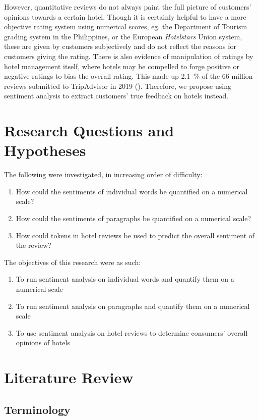 \documentclass[12pt, twoside, a4paper, draft]{pancake-article}
\begin{document}
However, quantitative reviews do not always paint the full picture of customers'
opinions towards a certain hotel. Though it is certainly helpful to have a more
objective rating system using numerical scores, eg. the Department of Tourism
grading system in the Philippines, or the European \textit{Hotelstars} Union system,
these are given by customers subjectively and do not reflect the reasons for
customers giving the rating. There is also evidence of manipulation of ratings
by hotel management itself, where hotels may be compelled to forge positive or
negative ratings to bias the overall rating. This made up \qty{2.1}{\percent}
of the 66 million reviews submitted to TripAdvisor in 2019 (\cite{tripadvisor}).
Therefore, we propose using sentiment analysis to extract customers' true
feedback on hotels instead.

\section{Research Questions and Hypotheses}
The following were investigated, in increasing order of difficulty:
\begin{enumerate}
	\item How could the sentiments of individual words be quantified on a numerical scale?
	\item How could the sentiments of paragraphs be quantified on a numerical scale?
	\item How could tokens in hotel reviews be used to predict the overall sentiment of the review?
\end{enumerate}

The objectives of this research were as such:
\begin{enumerate}
	\item To run sentiment analysis on individual words and quantify them on a numerical scale
	\item To run sentiment analysis on paragraphs and quantify them on a numerical scale
	\item To use sentiment analysis on hotel reviews to determine consumers' overall opinions of hotels
\end{enumerate}

\section{Literature Review}

\subsection{Terminology}
\end{document}
